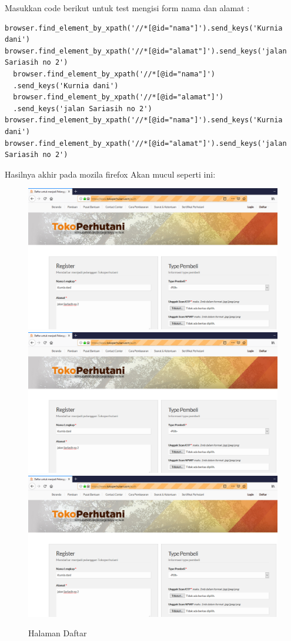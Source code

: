 Masukkan code berikut untuk test mengisi form nama dan alamat :
\begin{verbatim}
browser.find_element_by_xpath('//*[@id="nama"]').send_keys('Kurnia dani')
browser.find_element_by_xpath('//*[@id="alamat"]').send_keys('jalan Sariasih no 2')
  browser.find_element_by_xpath('//*[@id="nama"]')
  .send_keys('Kurnia dani')
  browser.find_element_by_xpath('//*[@id="alamat"]')
  .send_keys('jalan Sariasih no 2')
browser.find_element_by_xpath('//*[@id="nama"]').send_keys('Kurnia dani')
browser.find_element_by_xpath('//*[@id="alamat"]').send_keys('jalan Sariasih no 2')
\end{verbatim}

Hasilnya akhir pada mozila firefox Akan mucul seperti ini:
\begin{figure}[h]
	\centering
	\includegraphics[scale=0.25]{figures/4daftar}
	\includegraphics[scale=0.24]{figures/4daftar}
	\includegraphics[scale=0.25]{figures/4daftar}
	\caption{Halaman Daftar}
\end{figure}

